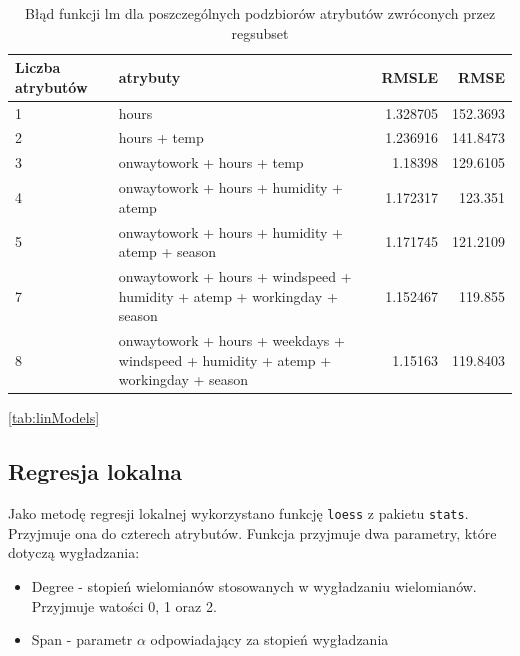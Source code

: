 \documentclass[a4paper,12pt]{article}
\begin{document}
        \begin{table}[h]
            \begin{tabular}{|p{2cm}|p{8cm}|r|r|}
                \hline
                Liczba atrybutów & atrybuty & RMSLE & RMSE \\
                \hline
                1 & 
                hours
                & 
                1.328705
                & 
                152.3693
                \\
                \hline
                2 & 
                hours + temp
                & 
                1.236916
                & 
                141.8473
                \\
                \hline
                3 & 
                onwaytowork + hours + temp
                & 
                1.18398
                & 
                129.6105
                \\
                \hline
                4 & 
                onwaytowork + hours + humidity + atemp
                & 
                1.172317
                & 
                123.351
                \\
                \hline
                5 &  onwaytowork + hours + humidity + atemp + season
                & 
                1.171745
                & 
                121.2109
                \\
                \hline
                7 & onwaytowork + hours + windspeed + humidity + atemp + workingday + season & 
                1.152467
                & 
                119.855
                \\
                \hline
                8 & 
                onwaytowork + hours + weekdays + windspeed + humidity + atemp + workingday + season 
                & 
                1.15163
                & 
                119.8403
                \\
                \hline
            \end{tabular}
            \caption{Błąd funkcji lm dla poszczególnych podzbiorów atrybutów zwróconych przez regsubset}
            \ref{tab:linModels}
        \end{table}
        
        
    \subsection{Regresja lokalna}
        Jako metodę regresji lokalnej wykorzystano funkcję \texttt{loess} z pakietu \texttt{stats}. Przyjmuje ona do czterech atrybutów. Funkcja przyjmuje dwa parametry, które dotyczą wygładzania:
        \begin{itemize}
            \item
                Degree - stopień wielomianów stosowanych w wygładzaniu wielomianów. Przyjmuje watości 0, 1 oraz 2.
            \item
                Span - parametr $\alpha$ odpowiadający za stopień wygładzania
        \end{itemize}
        
\end{document}
